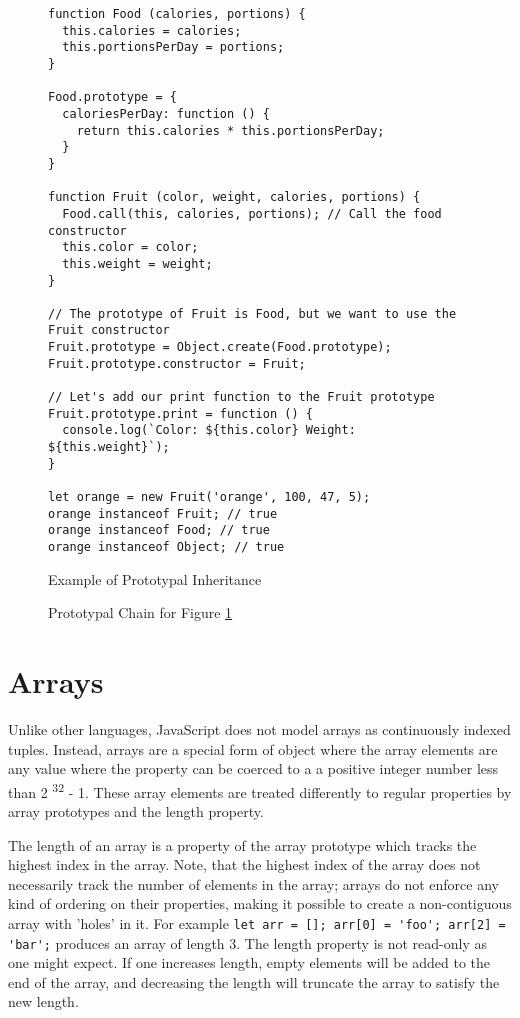 \documentclass[]{final_report}
\begin{document}
\begin{figure}[t]
\begin{verbatim}
function Food (calories, portions) {
  this.calories = calories;
  this.portionsPerDay = portions;
}

Food.prototype = {
  caloriesPerDay: function () {
    return this.calories * this.portionsPerDay;
  }
}

function Fruit (color, weight, calories, portions) {
  Food.call(this, calories, portions); // Call the food constructor
  this.color = color;
  this.weight = weight;
}

// The prototype of Fruit is Food, but we want to use the Fruit constructor
Fruit.prototype = Object.create(Food.prototype);
Fruit.prototype.constructor = Fruit;

// Let's add our print function to the Fruit prototype
Fruit.prototype.print = function () {
  console.log(`Color: ${this.color} Weight: ${this.weight}`);
}

let orange = new Fruit('orange', 100, 47, 5);
orange instanceof Fruit; // true
orange instanceof Food; // true
orange instanceof Object; // true
\end{verbatim}
\caption{\label{fig:js-prototypal-inheritance} Example of Prototypal Inheritance}
\end{figure} 

\begin{figure}[t]
\centering
\fboxsep 2mm
\caption{\label{fig:js-prototypal-chain} Prototypal Chain for Figure \ref{fig:js-prototypal-inheritance}}
\end{figure} 

\section{Arrays} \label{sec:arrays}
Unlike other languages, JavaScript does not model arrays as continuously indexed tuples. Instead, arrays are a special form of object where the array elements are any value where the property can be coerced to a a positive integer number less than 2 \textsuperscript{32} - 1. These array elements are treated differently to regular properties by array prototypes and the length property. 

The length of an array is a property of the array prototype which tracks the highest index in the array. Note, that the highest index of the array does not necessarily track the number of elements in the array; arrays do not enforce any kind of ordering on their properties, making it possible to create a non-contiguous array with 'holes' in it. For example \lstinline|let arr = []; arr[0] = 'foo'; arr[2] = 'bar';| produces an array of length 3. The length property is not read-only as one might expect. If one increases length, empty elements will be added to the end of the array, and decreasing the length will truncate the array to satisfy the new length.
\end{document}
